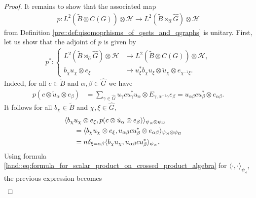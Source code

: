\documentclass{amsart}
\theoremstyle{definition}
\theoremstyle{definition}
\begin{document}
\begin{proof}
    It remains to show that the associated map 
    \begin{align*}
        p: L^2(\tilde{B} \otimes C(G)) \otimes \mathcal{H} \to L^2(\tilde{B} \rtimes_{\hat{\alpha}} \hat{G}) \otimes \mathcal{H}
    \end{align*}
    from Definition \ref{pre::def:qisomoprhisms_of_qsets_and_qgraphs} is unitary. First, let us show that the adjoint of $p$ is given by
    \begin{align}
        \label{qiso::eq:formula_for_p_adjoint}
        p^\ast: \left\{
        \begin{aligned} 
            L^2(\tilde{B} \rtimes_{\hat{\alpha}} \hat{G}) \otimes \mathcal{H} &\to L^2(\tilde{B} \otimes C(G)) \otimes \mathcal{H}, \\
            b_\chi u_\chi \otimes e_\xi &\mapsto u_\xi^\ast b_\chi u_\xi \otimes \tilde{u}_\chi \otimes e_{\chi^{-1}\xi}.
        \end{aligned} \right.
    \end{align}
    Indeed, for all $c \in \tilde{B}$ and $\alpha, \beta \in \hat{G}$ we have
    \begin{align*}
        p(c \otimes \tilde{u}_\alpha \otimes e_\beta) 
        &= \sum_{\gamma \in \hat{G}} u_\gamma c u_\gamma^\ast u_\alpha \otimes E_{\gamma, \alpha^{-1} \gamma} e_\beta
        = u_{\alpha\beta} c u_{\beta}^\ast \otimes e_{\alpha\beta}.
    \end{align*}
    It follows for all $b_\chi \in \tilde{B}$ and $\chi, \xi \in \hat{G}$,
    \begin{align*}
        \begin{aligned}
        &\hspace{-.5cm} \langle b_\chi u_\chi \otimes e_\xi, p(c \otimes \tilde{u}_\alpha \otimes e_\beta) \rangle_{\psi_{\rtimes} \otimes \psi_G} \\
            &= \langle b_\chi u_\chi \otimes e_\xi,  u_{\alpha\beta } c u_{\beta}^\ast \otimes e_{\alpha\beta} \rangle_{\psi_{\rtimes} \otimes \psi_G} \\
            &= n \delta_{\xi=\alpha\beta} \langle b_\chi u_\chi, u_{\alpha\beta } c u_{\beta}^\ast \rangle_{\psi_\rtimes}.
    \end{aligned}
    \end{align*}
    Using formula \eqref{land::eq:formula_for_scalar_product_on_crossed_product_algebra} for $\langle \cdot, \cdot \rangle_{\psi_\rtimes}$, the previous expression becomes
    \begin{align}
        \label{land::eq:computation_of_p_to_compare_with_p_adjoint}

\end{align}
\end{proof}
\end{document}
